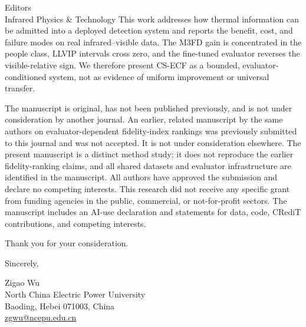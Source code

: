 \documentclass[a4paper,10pt]{letter}
\begin{document}
\begin{letter}{Editors\\Infrared Physics \& Technology}
This work addresses how thermal information can be admitted into a deployed
detection system and reports the benefit, cost, and failure modes on real
infrared--visible data. The M3FD gain is concentrated in the people class,
LLVIP intervals cross zero, and the fine-tuned evaluator reverses the
visible-relative sign. We therefore present CS-ECF as a bounded,
evaluator-conditioned system, not as evidence of uniform improvement or
universal transfer.

The manuscript is original, has not been published previously, and is not under
consideration by another journal. An earlier, related manuscript by the same
authors on evaluator-dependent fidelity-index rankings was previously submitted
to this journal and was not accepted. It is not under consideration elsewhere.
The present manuscript is a distinct method study; it does not reproduce the
earlier fidelity-ranking claims, and all shared datasets and evaluator
infrastructure are identified in the manuscript. All authors have approved the
submission and declare no competing interests. This research did not receive any
specific grant from funding agencies in the public, commercial, or
not-for-profit sectors. The manuscript includes an AI-use declaration and
statements for data, code, CRediT contributions, and competing interests.

Thank you for your consideration.

\closing{Sincerely,}
Zigao Wu\\
North China Electric Power University\\
Baoding, Hebei 071003, China\\
\href{mailto:zgwu@ncepu.edu.cn}{zgwu@ncepu.edu.cn}
\end{letter}
\end{document}
